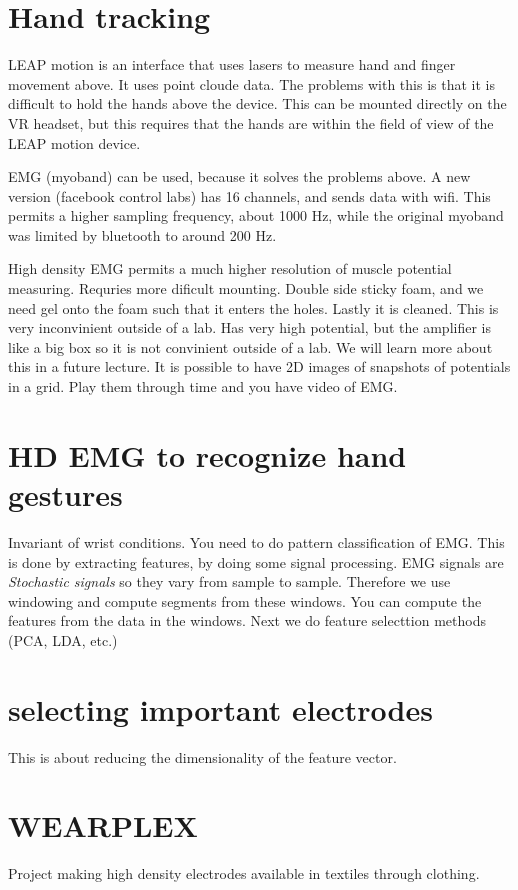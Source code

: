 \documentclass[a4paper]{article}
\begin{document}
\section{Hand tracking}
LEAP motion is an interface that uses lasers to measure hand and finger movement above. It uses point cloude data. The problems with this is that it is difficult to hold the hands above the device. This can be mounted directly on the VR headset, but this requires that the hands are within the field of view of the LEAP motion device. 

EMG (myoband) can be used, because it solves the problems above. A new version (facebook control labs) has 16 channels, and sends data with wifi. This permits a higher sampling frequency, about 1000 Hz, while the original myoband was limited by bluetooth to around 200 Hz. 


High density EMG permits a much higher resolution of muscle potential measuring. Requries more dificult mounting. Double side sticky foam, and we need gel onto the foam such that it enters the holes. Lastly it is cleaned. This is very inconvinient outside of a lab. Has very high potential, but the amplifier is like a big box so it is not convinient outside of a lab. We will learn more about this in a future lecture.
It is possible to have 2D images of snapshots of potentials in a grid. Play them through time and you have video of EMG. 


\section{HD EMG to recognize hand gestures}
Invariant of wrist conditions. You need to do pattern classification of EMG. This is done by extracting features, by doing some signal processing. EMG signals are \textit{Stochastic signals} so they vary from sample to sample. Therefore we use windowing and compute segments from these windows. You can compute the features from the data in the windows. Next we do feature selecttion methods (PCA, LDA, etc.) 

\section{selecting important electrodes}
This is about reducing the dimensionality of the feature vector.

\section{WEARPLEX}
Project making high density electrodes available in textiles through clothing.
\end{document}
